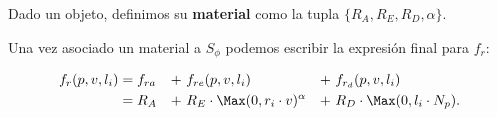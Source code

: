 
\begin{definicion}
    Dado un objeto, definimos su \textbf{material} como la tupla $\{R_A,R_E,R_D,\alpha \}$.
\end{definicion}

Una vez asociado un material a $S_{\phi}$ podemos escribir la expresión final para $f_r$:

\begin{align}\label{eq:fr}
    f_r(p,v,l_i) &= f_{ra} &+\ & f_{re}(p,v,l_i) &+\ &f_{r_d}(p,v,l_i)\\
                 &= R_A    &+\ & R_E \cdot \Max(0,r_i \cdot v)^{\alpha} &+\  &R_D\cdot \Max(0,l_i\cdot N_p). 
\end{align}


